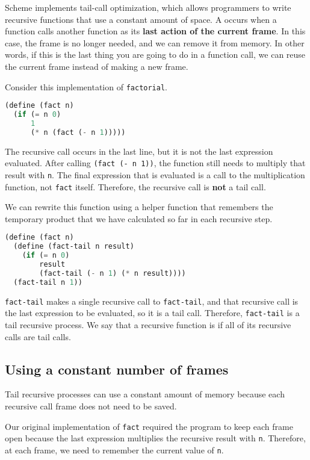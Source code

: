 Scheme implements tail-call optimization, which allows programmers to write
recursive functions that use a constant amount of space. A 
occurs when a function calls another function as its \textbf{last action of the
current frame}. In this case, the frame is no longer needed, and we
can remove it from memory. In other words, if this is the last thing you are
going to do in a function call, we can reuse the current frame instead
of making a new frame.

Consider this implementation of \texttt{factorial}.

\begin{lstlisting}[language=Scheme]
(define (fact n)
  (if (= n 0)
      1
      (* n (fact (- n 1)))))
\end{lstlisting}

The recursive call occurs in the last line, but it is not the last expression
evaluated. After calling \texttt{(fact (- n 1))}, the function still needs to
multiply that result with \texttt{n}. The final expression that is evaluated is
a call to the multiplication function, not \texttt{fact} itself.  Therefore,
the recursive call is \textbf{not} a tail call.

We can rewrite this function using a helper function that remembers the
temporary product that we have calculated so far in each recursive step.

\begin{lstlisting}[language=Scheme]
(define (fact n)
  (define (fact-tail n result)
    (if (= n 0)
        result
        (fact-tail (- n 1) (* n result))))
  (fact-tail n 1))
\end{lstlisting}

\texttt{fact-tail} makes a single recursive call to \texttt{fact-tail}, and
that recursive call is the last expression to be evaluated, so it is a tail
call. Therefore, \texttt{fact-tail} is a tail recursive process. We say that a
recursive function is  if all of its recursive calls are
tail calls.

\subsection*{Using a constant number of frames}

Tail recursive processes can use a constant amount of memory because each
recursive call frame does not need to be saved.

Our original implementation of \texttt{fact} required the program to keep each
frame open because the last expression multiplies the recursive result with
\texttt{n}.  Therefore, at each frame, we need to remember the current value of
\texttt{n}.

